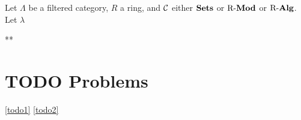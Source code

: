 \documentclass[11pt]{article}
\begin{document}
\begin{proposition}[]
\label{7.7}
Let \(\Lambda\) be a filtered category, \(R\) a ring, and \(\mathcal{C}\) either \(\operatorname{\textbf{Sets}}\) or
\(\operatorname{R-\textbf{Mod}}\) or \(\operatorname{R-\textbf{Alg}}\). Let \(\lambda\)
\end{proposition}































**
\section{{\bfseries\sffamily TODO} Problems}
\label{sec:org950274f}
\ref{todo1}
\ref{todo2}
\end{document}
